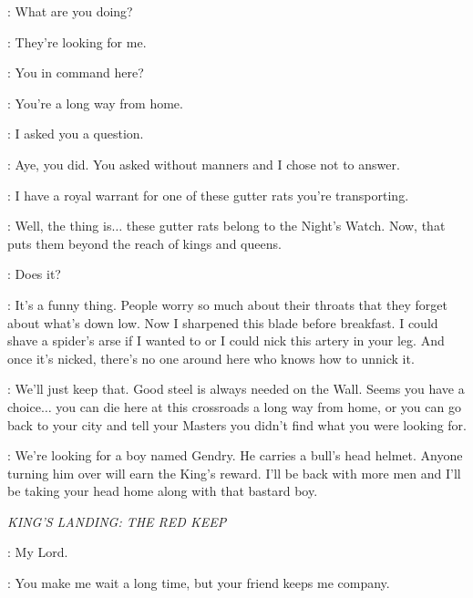 
\GENDRY: What are you doing?

\ARYA: They're looking for me.

\GOLDCLOAK: You in command here?

\YOREN: You're a long way from home.

\GOLDCLOAK: I asked you a question.

\YOREN: Aye, you did. You asked without manners and I chose not to answer.

\GOLDCLOAK: I have a royal warrant for one of these gutter rats you're transporting.

\YOREN: Well, the thing is$\ldots$ these gutter rats belong to the Night's Watch. Now, that puts them beyond the reach of kings and queens.

\GOLDCLOAK: Does it?


\YOREN: It's a funny thing. People worry so much about their throats that they forget about what's down low. Now I sharpened this blade before breakfast. I could shave a spider's arse if I wanted to or I could nick this artery in your leg. And once it's nicked, there's no one around here who knows how to unnick it.


\YOREN: We'll just keep that. Good steel is always needed on the Wall. Seems you have a choice$\ldots$ you can die here at this crossroads a long way from home, or you can go back to your city and tell your Masters you didn't find what you were looking for.

\GOLDCLOAK: We're looking for a boy named Gendry. He carries a bull's head helmet. Anyone turning him over will earn the King's reward. I'll be back with more men and I'll be taking your head home along with that bastard boy.


\scene

\textit{KING'S LANDING: THE RED KEEP}


\VARYS: My Lord.

\SHAE: You make me wait a long time, but your friend keeps me company.

